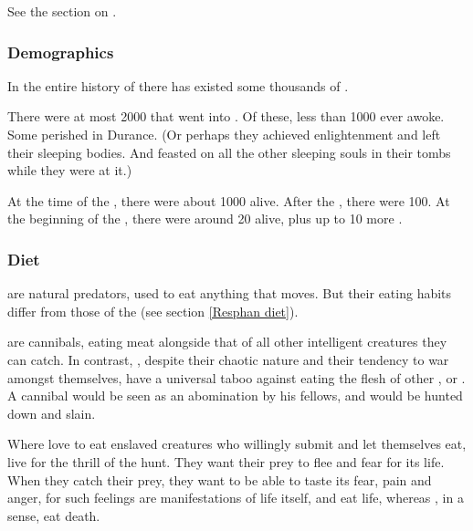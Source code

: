 See the section on .





\subsubsection{Demographics}
In the entire history of \Miith there has existed some thousands of \dragons. 

There were at most 2000 \dragons that went into . 
Of these, less than 1000 ever awoke. 
Some perished in Durance. 
(Or perhaps they achieved enlightenment and left their sleeping bodies. 
 And feasted on all the other sleeping souls in their tombs while they were at it.)
 
At the time of the , there were about 1000 \dragons alive.
After the , there were 100. 
At the beginning of the \thirdbanewar, there were around 20 \dragons alive, plus up to 10 more . 





\subsubsection{Diet}
\Dragons{} are natural predators, used to eat anything that moves. But their eating habits differ from those of the \resphain{} (see section \ref{Resphan diet}). 

\Resphain{} are cannibals, eating \resphan{} meat alongside that of all other intelligent creatures they can catch. In contrast, \dragons, despite their chaotic nature and their tendency to war amongst themselves, have a universal taboo against eating the flesh of other \dragons{}, \ophidians{} or \rachyth. A cannibal \dragon{} would be seen as an abomination by his fellows, and would be hunted down and slain. 

Where \resphain{} love to eat enslaved creatures who willingly submit and let themselves eat, \dragons{} live for the thrill of the hunt. They want their prey to flee and fear for its life. When they catch their prey, they want to be able to taste its fear, pain and anger, for such feelings are manifestations of life itself, and \dragons{} eat life, whereas \resphain, in a sense, eat death. 





